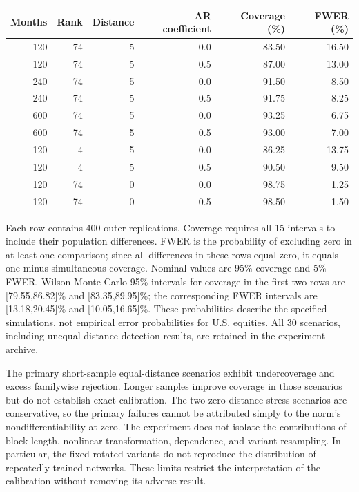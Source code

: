 \begin{widetable}[!tbp]
\centering
\caption{Equal-distance calibration: simultaneous coverage and familywise rejection}
\label{tab:inference-calibration}
\small
\begin{tabular}{rrrrrr}
\toprule
Months & Rank & Distance & AR coefficient & Coverage (\%) & FWER (\%) \\
\midrule
120 & 74 & 5 & 0.0 & 83.50 & 16.50 \\
120 & 74 & 5 & 0.5 & 87.00 & 13.00 \\
240 & 74 & 5 & 0.0 & 91.50 & 8.50 \\
240 & 74 & 5 & 0.5 & 91.75 & 8.25 \\
600 & 74 & 5 & 0.0 & 93.25 & 6.75 \\
600 & 74 & 5 & 0.5 & 93.00 & 7.00 \\
120 & 4 & 5 & 0.0 & 86.25 & 13.75 \\
120 & 4 & 5 & 0.5 & 90.50 & 9.50 \\
120 & 74 & 0 & 0.0 & 98.75 & 1.25 \\
120 & 74 & 0 & 0.5 & 98.50 & 1.50 \\
\bottomrule
\end{tabular}
\par\smallskip
\begin{minipage}{0.96\linewidth}\footnotesize
Each row contains 400 outer replications. Coverage requires all 15 intervals
to include their population differences. FWER is the probability of excluding
zero in at least one comparison; since all differences in these rows equal
zero, it equals one minus simultaneous coverage. Nominal values are 95\%
coverage and 5\% FWER. Wilson Monte Carlo 95\% intervals for coverage in the
first two rows are [79.55,86.82]\% and [83.35,89.95]\%; the corresponding FWER
intervals are [13.18,20.45]\% and [10.05,16.65]\%. These probabilities describe
the specified simulations, not empirical error probabilities for U.S. equities.
All 30 scenarios, including unequal-distance detection results, are retained
in the experiment archive.
\end{minipage}
\end{widetable}

The primary short-sample equal-distance scenarios exhibit undercoverage and
excess familywise rejection. Longer samples improve coverage in those scenarios
but do not establish exact calibration. The two zero-distance stress scenarios
are conservative, so the primary failures cannot be attributed simply to the
norm's nondifferentiability at zero. The experiment does not isolate the
contributions of block length, nonlinear transformation, dependence, and
variant resampling. In particular, the fixed rotated variants do not reproduce
the distribution of repeatedly trained networks. These limits restrict the
interpretation of the calibration without removing its adverse result.

